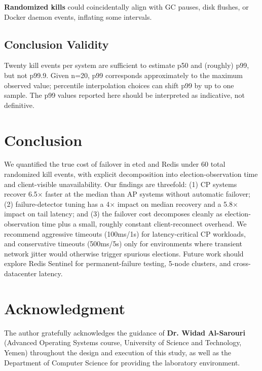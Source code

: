 \documentclass[conference]{IEEEtran}
\begin{document}
\textbf{Randomized kills} could coincidentally align with GC pauses, disk flushes, or Docker daemon events, inflating some intervals.

\subsection{Conclusion Validity}
Twenty kill events per system are sufficient to estimate p50 and (roughly) p99, but not p99.9. Given n=20, p99 corresponds approximately to the maximum observed value; percentile interpolation choices can shift p99 by up to one sample. The p99 values reported here should be interpreted as indicative, not definitive.

\section{Conclusion}
We quantified the true cost of failover in etcd and Redis under 60 total randomized kill events, with explicit decomposition into election-observation time and client-visible unavailability. Our findings are threefold: (1) CP systems recover 6.5$\times$ faster at the median than AP systems without automatic failover; (2) failure-detector tuning has a 4$\times$ impact on median recovery and a 5.8$\times$ impact on tail latency; and (3) the failover cost decomposes cleanly as election-observation time plus a small, roughly constant client-reconnect overhead. We recommend aggressive timeouts (100ms/1s) for latency-critical CP workloads, and conservative timeouts (500ms/5s) only for environments where transient network jitter would otherwise trigger spurious elections. Future work should explore Redis Sentinel for permanent-failure testing, 5-node clusters, and cross-datacenter latency.

\section*{Acknowledgment}
The author gratefully acknowledges the guidance of \textbf{Dr. Widad Al-Sarouri} (Advanced Operating Systems course, University of Science and Technology, Yemen) throughout the design and execution of this study, as well as the Department of Computer Science for providing the laboratory environment.
\end{document}
